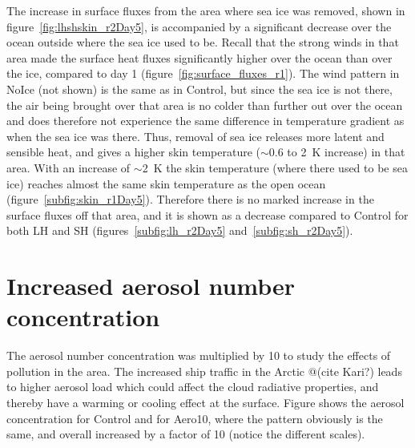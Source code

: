 The increase in surface fluxes from the area where sea ice was removed, shown in figure~\ref{fig:lhshskin_r2Day5}, is accompanied by a significant decrease over the ocean outside where the sea ice used to be. Recall that the strong winds in that area made the surface heat fluxes significantly higher over the ocean than over the ice, compared to day 1 (figure~\ref{fig:surface_fluxes_r1}). The wind pattern in NoIce (not shown) is the same as in Control, but since the sea ice is not there, the air being brought over that area is no colder than further out over the ocean and does therefore not experience the same difference in temperature gradient as when the sea ice was there. Thus, removal of sea ice releases more latent and sensible heat, and gives a higher skin temperature ($\sim$0.6 to 2~K increase) in that area. With an increase of $\sim$2~K the skin temperature (where there used to be sea ice) reaches almost the same skin temperature as the open ocean (figure~\ref{subfig:skin_r1Day5}). Therefore there is no marked increase in the surface fluxes off that area, and it is shown as a decrease compared to Control for both LH and SH (figures~\ref{subfig:lh_r2Day5} and~\ref{subfig:sh_r2Day5}).

\clearpage
\section{Increased aerosol number concentration}
The aerosol number concentration was multiplied by 10 to study the effects of pollution in the area. The increased ship traffic in the Arctic @(cite Kari?) leads to higher aerosol load which could affect the cloud radiative properties, and thereby have a warming or cooling effect at the surface. Figure%
shows the aerosol concentration for Control and for Aero10, where the pattern obviously is the same, and overall increased by a factor of 10 (notice the different scales).



